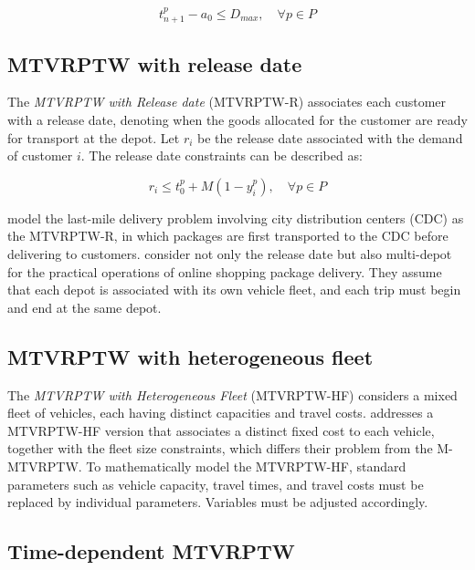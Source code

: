 \begin{equation} \label{eq24}
    t^p_{n+1} - a_0 \leq D_{max}, \quad \forall p \in P
\end{equation}

\subsection{MTVRPTW with release date}

The \textit{MTVRPTW with Release date} (MTVRPTW-R) associates each customer with a release date, denoting when the goods allocated for the customer are ready for transport at the depot.  Let $r_i$ be the release date associated with the demand of customer $i$.  The release date constraints can be described as:

\begin{equation} \label{eq25}
    r_i \leq t^p_0 + M(1 - y^p_i), \quad \forall p \in P
\end{equation}

\cite{cattaruzza2016multi} model the last-mile delivery problem involving city distribution centers (CDC) as the MTVRPTW-R, in which packages are first transported to the CDC before delivering to customers.  \cite{zhen2020multi} consider not only the release date but also multi-depot for the practical operations of online shopping package delivery.  They assume that each depot is associated with its own vehicle fleet, and each trip must begin and end at the same depot.

\subsection{MTVRPTW with heterogeneous fleet}

The \textit{MTVRPTW with Heterogeneous Fleet} (MTVRPTW-HF) considers a mixed fleet of vehicles, each having distinct capacities and travel costs.  \cite{despaux2016multi} addresses a MTVRPTW-HF version that associates a distinct fixed cost to each vehicle, together with the fleet size constraints, which differs their problem from the M-MTVRPTW.  To mathematically model the MTVRPTW-HF, standard parameters such as vehicle capacity, travel times, and travel costs must be replaced by individual parameters.  Variables must be adjusted accordingly.

\subsection{Time-dependent MTVRPTW}

